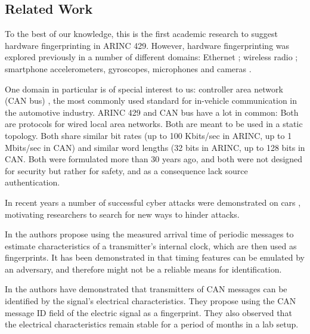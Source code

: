 \documentclass[conference]{IEEEtran}
\begin{document}
\subsection{Related Work} \label{RelatedWork}
  To the best of our knowledge, this is the first academic research to suggest hardware fingerprinting in ARINC 429. However, hardware fingerprinting was explored previously in a number of different domains: Ethernet \cite{kohno2005remote, uluagac2013passive, gerdes2012physical}; wireless radio \cite{ellis2001characteristics, brik2008wireless, xu2015device}; smartphone accelerometers, gyroscopes, microphones and cameras \cite{dey2014accelprint, das2016tracking}.
  
  One domain in particular is of special interest to us: controller area network (CAN bus) \cite{bosch1991canbus}, the most commonly used standard for in-vehicle communication in the automotive industry. ARINC 429 and CAN bus have a lot in common: Both are protocols for wired local area networks. Both are meant to be used in a static topology. Both share similar bit rates (up to 100 Kbits/sec in ARINC, up to 1 Mbits/sec in CAN) and similar word lengths (32 bits in ARINC, up to 128 bits in CAN. Both were formulated more than 30 years ago, and both were not designed for security but rather for safety, and as a consequence lack source authentication.
  
  In recent years a number of successful cyber attacks were demonstrated on cars \cite{miller2015remote}, motivating researchers to search for new ways to hinder attacks.
  
  
  In \cite{cho2016fingerprinting} the authors propose using the measured arrival time of periodic messages to estimate characteristics of a transmitter's internal clock, which are then used as fingerprints. It has been demonstrated in \cite{sagong2018cloaking} that timing features can be emulated by an adversary, and therefore might not be a reliable means for identification.
  
  In \cite{murvay2014source} the authors have demonstrated that transmitters of CAN messages can be identified by the signal's electrical characteristics. They propose using the CAN message ID field of the electric signal as a fingerprint. They also observed that the electrical characteristics remain stable for a period of months in a lab setup.
  
\end{document}
